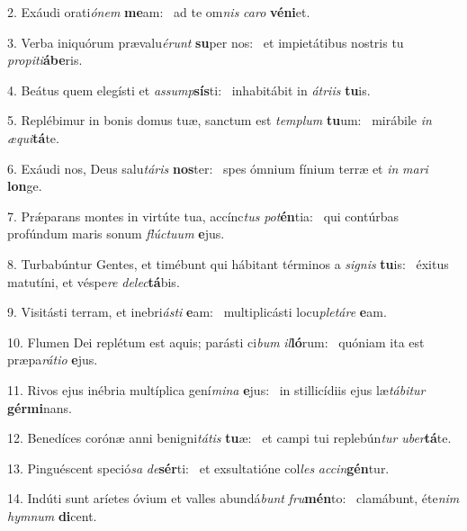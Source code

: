 2. Exáudi orati\textit{ó}\textit{nem} \textbf{me}am: \ast\  ad te om\textit{nis} \textit{ca}\textit{ro} \textbf{vé}\textbf{ni}et.\

3. Verba iniquórum prævalu\textit{é}\textit{runt} \textbf{su}per nos: \ast\  et impietátibus nostris tu \textit{pro}\textit{pi}\textit{ti}\textbf{á}\textbf{be}ris.\

4. Beátus quem elegísti et \textit{as}\textit{sump}\textbf{sís}ti: \ast\  inhabitábit in \textit{á}\textit{tri}\textit{is} \textbf{tu}is.\

5. Replébimur in bonis domus tuæ, sanctum est \textit{tem}\textit{plum} \textbf{tu}um: \ast\  mirábile \textit{in} \textit{æ}\textit{qui}\textbf{tá}te.\

6. Exáudi nos, Deus salu\textit{tá}\textit{ris} \textbf{nos}ter: \ast\  spes ómnium fínium terræ et \textit{in} \textit{ma}\textit{ri} \textbf{lon}ge.\

7. Prǽparans montes in virtúte tua, accínc\textit{tus} \textit{pot}\textbf{én}tia: \ast\  qui contúrbas profúndum maris sonum \textit{flúc}\textit{tu}\textit{um} \textbf{e}jus.\

8. Turbabúntur Gentes, et timébunt qui hábitant términos a \textit{si}\textit{gnis} \textbf{tu}is: \ast\  éxitus matutíni, et véspe\textit{re} \textit{de}\textit{lec}\textbf{tá}bis.\

9. Visitásti terram, et inebri\textit{ás}\textit{ti} \textbf{e}am: \ast\  multiplicásti locu\textit{ple}\textit{tá}\textit{re} \textbf{e}am.\

10. Flumen Dei replétum est aquis; parásti ci\textit{bum} \textit{il}\textbf{ló}rum: \ast\  quóniam ita est præpa\textit{rá}\textit{ti}\textit{o} \textbf{e}jus.\

11. Rivos ejus inébria multíplica gení\textit{mi}\textit{na} \textbf{e}jus: \ast\  in stillicídiis ejus læ\textit{tá}\textit{bi}\textit{tur} \textbf{gér}\textbf{mi}nans.\

12. Benedíces corónæ anni benigni\textit{tá}\textit{tis} \textbf{tu}æ: \ast\  et campi tui replebún\textit{tur} \textit{u}\textit{ber}\textbf{tá}te.\

13. Pinguéscent speció\textit{sa} \textit{de}\textbf{sér}ti: \ast\  et exsultatióne col\textit{les} \textit{ac}\textit{cin}\textbf{gén}tur.\

14. Indúti sunt aríetes óvium et valles abundá\textit{bunt} \textit{fru}\textbf{mén}to: \ast\  clamábunt, éte\textit{nim} \textit{hym}\textit{num} \textbf{di}cent.\

